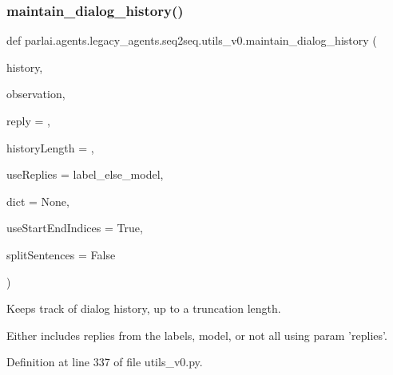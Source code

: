 \subsubsection{\texorpdfstring{maintain\+\_\+dialog\+\_\+history()}{maintain\_dialog\_history()}}
{\footnotesize\ttfamily def parlai.\+agents.\+legacy\+\_\+agents.\+seq2seq.\+utils\+\_\+v0.\+maintain\+\_\+dialog\+\_\+history (\begin{DoxyParamCaption}\item[{}]{history,  }\item[{}]{observation,  }\item[{}]{reply = {\ttfamily \textquotesingle{}\textquotesingle{}},  }\item[{}]{history\+Length = {},  }\item[{}]{use\+Replies = {\ttfamily \textquotesingle{}label\+\_\+else\+\_\+model\textquotesingle{}},  }\item[{}]{dict = {\ttfamily None},  }\item[{}]{use\+Start\+End\+Indices = {\ttfamily True},  }\item[{}]{split\+Sentences = {\ttfamily False} }\end{DoxyParamCaption})}

\begin{DoxyVerb}Keeps track of dialog history, up to a truncation length.

Either includes replies from the labels, model, or not all using param 'replies'.
\end{DoxyVerb}
 

Definition at line 337 of file utils\+\_\+v0.\+py.


